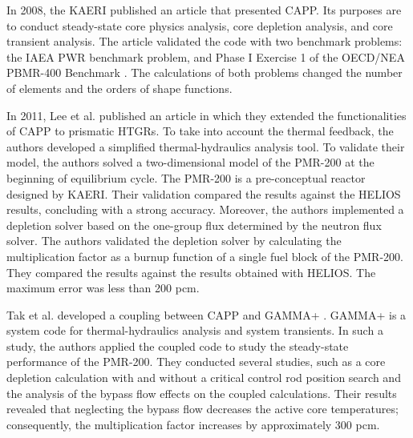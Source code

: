 In 2008, the \gls{KAERI} published an article \cite{lee_development_2008} that presented CAPP.
Its purposes are to conduct steady-state core physics analysis, core depletion analysis, and core transient analysis.
The article validated the code with two benchmark problems: the IAEA PWR benchmark problem, and Phase I Exercise 1 of the OECD/NEA PBMR-400 Benchmark \cite{reitsma_oecd-neansc_2008}.
The calculations of both problems changed the number of elements and the orders of shape functions.

In 2011, Lee et al. published an article \cite{lee_development_2011} in which they extended the functionalities of CAPP to prismatic \glspl{HTGR}.
To take into account the thermal feedback, the authors developed a simplified thermal-hydraulics analysis tool.
To validate their model, the authors solved a two-dimensional model of the PMR-200 at the beginning of equilibrium cycle.
The PMR-200 is a pre-conceptual reactor designed by \gls{KAERI}.
Their validation compared the results against the HELIOS\cite{stammler_helios_1998} results, concluding with a strong accuracy.
Moreover, the authors implemented a depletion solver based on the one-group flux determined by the neutron flux solver.
The authors validated the depletion solver by calculating the multiplication factor as a burnup function of a single fuel block of the PMR-200.
They compared the results against the results obtained with HELIOS.
The maximum error was less than 200 pcm.

Tak et al. \cite{tak_cappgamma_2016} developed a coupling between CAPP and GAMMA+ \cite{lim_gamma_2006}.
GAMMA+ is a system code for thermal-hydraulics analysis and system transients.
In such a study, the authors applied the coupled code to study the steady-state performance of the PMR-200.
They conducted several studies, such as a core depletion calculation with and without a critical control rod position search and the analysis of the bypass flow effects on the coupled calculations.
Their results revealed that neglecting the bypass flow decreases the active core temperatures; consequently, the multiplication factor increases by approximately 300 pcm.

